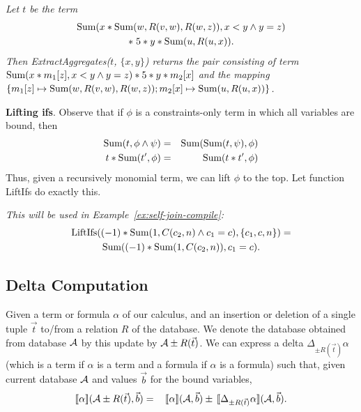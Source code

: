 \begin{example}\em
Let $t$ be the term
\begin{multline*}
\mbox{Sum}(x*\mbox{Sum}(w, R(v, w), R(w, z)), x<y \land y=z) \\
*\; 5 * y * \mbox{Sum}(u, R(u, x)).
\end{multline*}
Then ExtractAggregates($t$, $\{x,y\}$) returns the pair consisting of term
$\mbox{Sum}(x*m_1[z], x<y \land y=z) * 5 * y * m_2[x]$
and the mapping
$\{
m_1[z] \mapsto \mbox{Sum}(w, R(v, w), R(w, z));
m_2[x] \mapsto \mbox{Sum}(u, R(u, x))
\}$.
\punto
\end{example}


{\bf Lifting ifs}. Observe that if $\phi$ is a constraints-only term in which
all variables are bound, then
\begin{eqnarray*}
\mbox{Sum}(t, \phi \land \psi) &=& \mbox{Sum}(\mbox{Sum}(t, \psi), \phi) \\
t * \mbox{Sum}(t', \phi) &=& \mbox{Sum}(t * t', \phi)
\end{eqnarray*}
Thus, given a recursively monomial term, we can lift $\phi$ to the top. 
Let function LiftIfs do exactly this.

\begin{example}\em
This will be used in Example~\ref{ex:self-join-compile}:
\begin{multline*}
\mbox{LiftIfs}((-1) * \mbox{Sum}(1, C(c_2, n) \land c_1=c), \{c_1, c, n\}) = \\
\mbox{Sum}((-1) * \mbox{Sum}(1, C(c_2, n)), c_1=c).
\end{multline*}
\end{example}


\subsection{Delta Computation}


\def\dt{\Delta_{\pm R(\vec{t})}}


Given a term or formula $\alpha$
of our calculus, and an insertion or deletion of a
single tuple $\vec{t}$ to/from a relation $R$ of the database.
We denote the database obtained from database $\db$ by this update by
$\db \pm R(\vec{t})$.
We can express a delta $\Delta_{\pm R(\vec{t})} \alpha$
(which is a term if $\alpha$ is a term and a formula if $\alpha$ is a formula)
such that,
given current database $\db$ and values $\vec{b}$ for the bound variables,
\begin{eqnarray}
\Bracks{\alpha}(\db \pm R(\vec{t}), \vec{b}) &=&
\,\Bracks{\alpha}(\db, \vec{b}) \pm \,\Bracks{\dt \alpha}(\db, \vec{b}).
\label{eq:delta}
\end{eqnarray}

